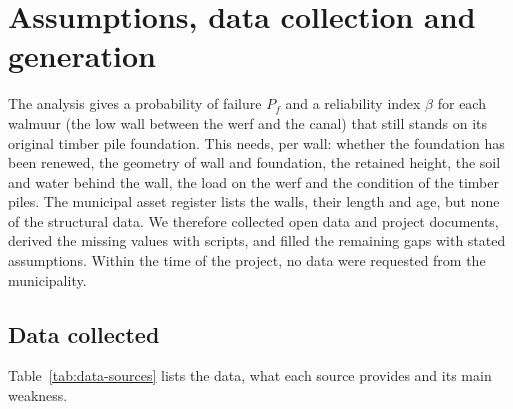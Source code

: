 
\section{Assumptions, data collection and generation}\label{sec:data}

The analysis gives a probability of failure $P_f$ and a reliability index
$\beta$ for each walmuur (the low wall between the werf and the canal) that
still stands on its original timber pile foundation. This needs, per wall:
whether the foundation has been renewed, the geometry of wall and foundation,
the retained height, the soil and water behind the wall, the load on the werf
and the condition of the timber piles. The municipal asset register lists the
walls, their length and age, but none of the structural data. We therefore
collected open data and project documents, derived the missing values with
scripts, and filled the remaining gaps with stated assumptions. Within the
time of the project, no data were requested from the municipality.

\subsection{Data collected}\label{sec:data-collected}

Table~\ref{tab:data-sources} lists the data, what each source provides and its
main weakness.

